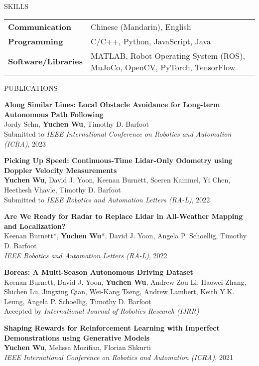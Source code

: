 \documentclass{cv}
\begin{document}
\begin{rSection}{SKILLS}
  \item
  \begin{tabular}{ @{} >{\bfseries}l @{\hspace{6ex}} l }
    Communication      & Chinese (Mandarin), English                                                         \\
    Programming        & C/C++, Python, JavaScript, Java                                           \\
    Software/Libraries & MATLAB, Robot Operating System (ROS), MuJoCo, OpenCV, PyTorch, TensorFlow \\
  \end{tabular}
\end{rSection}

\begin{rSection}{PUBLICATIONS}
  \item \textbf{Along Similar Lines: Local Obstacle Avoidance for Long-term Autonomous Path Following}\\
  Jordy Sehn, \textbf{Yuchen Wu}, Timothy D. Barfoot\\
  Submitted to \textit{IEEE International Conference on Robotics and Automation (ICRA)}, 2023

  \item \textbf{Picking Up Speed: Continuous-Time Lidar-Only Odometry using Doppler Velocity Measurements}\\
  \textbf{Yuchen Wu}, David J. Yoon, Keenan Burnett, Soeren Kammel, Yi Chen, Heethesh Vhavle, Timothy D. Barfoot\\
  Submitted to \textit{IEEE Robotics and Automation Letters (RA-L)}, 2022

  \item \textbf{Are We Ready for Radar to Replace Lidar in All-Weather Mapping and Localization?}\\
  Keenan Burnett*, \textbf{Yuchen Wu}*, David J. Yoon, Angela P. Schoellig, Timothy D. Barfoot\\
  \textit{IEEE Robotics and Automation Letters (RA-L)}, 2022

  \item \textbf{Boreas: A Multi-Season Autonomous Driving Dataset}\\
  Keenan Burnett, David J. Yoon, \textbf{Yuchen Wu}, Andrew Zou Li, Haowei Zhang, Shichen Lu, Jingxing Qian, Wei-Kang Tseng, Andrew Lambert, Keith Y.K. Leung, Angela P. Schoellig, Timothy D. Barfoot\\
  Accepted by \textit{International Journal of Robotics Research (IJRR)}

  \item \textbf{Shaping Rewards for Reinforcement Learning with Imperfect Demonstrations using Generative Models}\\
  \textbf{Yuchen Wu}, Melissa Mozifian, Florian Shkurti\\
  \textit{IEEE International Conference on Robotics and Automation (ICRA)}, 2021
\end{rSection}
\end{document}
